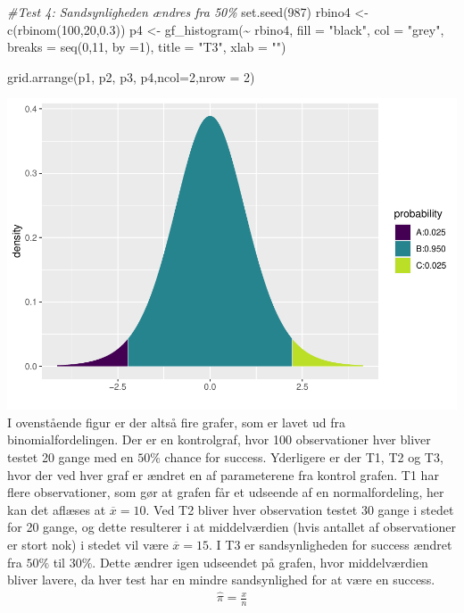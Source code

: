 \documentclass[
]{article}
\newenvironment{Shaded}{\begin{snugshade}}{\end{snugshade}}
\newcommand{\AttributeTok}[1]{\textcolor[rgb]{0.77,0.63,0.00}{#1}}
\newcommand{\CommentTok}[1]{\textcolor[rgb]{0.56,0.35,0.01}{\textit{#1}}}
\newcommand{\DecValTok}[1]{\textcolor[rgb]{0.00,0.00,0.81}{#1}}
\newcommand{\FloatTok}[1]{\textcolor[rgb]{0.00,0.00,0.81}{#1}}
\newcommand{\FunctionTok}[1]{\textcolor[rgb]{0.00,0.00,0.00}{#1}}
\newcommand{\NormalTok}[1]{#1}
\newcommand{\OtherTok}[1]{\textcolor[rgb]{0.56,0.35,0.01}{#1}}
\newcommand{\SpecialCharTok}[1]{\textcolor[rgb]{0.00,0.00,0.00}{#1}}
\newcommand{\StringTok}[1]{\textcolor[rgb]{0.31,0.60,0.02}{#1}}
\begin{document}
\begin{Shaded}
\begin{Highlighting}[]
\CommentTok{\#Test 4: Sandsynligheden ændres fra 50\%}
\FunctionTok{set.seed}\NormalTok{(}\DecValTok{987}\NormalTok{)}
\NormalTok{rbino4 }\OtherTok{\textless{}{-}} \FunctionTok{c}\NormalTok{(}\FunctionTok{rbinom}\NormalTok{(}\DecValTok{100}\NormalTok{,}\DecValTok{20}\NormalTok{,}\FloatTok{0.3}\NormalTok{))}
\NormalTok{p4 }\OtherTok{\textless{}{-}} \FunctionTok{gf\_histogram}\NormalTok{(}\SpecialCharTok{\textasciitilde{}}\NormalTok{ rbino4, }\AttributeTok{fill =} \StringTok{"black"}\NormalTok{, }\AttributeTok{col =} \StringTok{"grey"}\NormalTok{, }\AttributeTok{breaks =} \FunctionTok{seq}\NormalTok{(}\DecValTok{0}\NormalTok{,}\DecValTok{11}\NormalTok{, }\AttributeTok{by =}\DecValTok{1}\NormalTok{), }\AttributeTok{title =} \StringTok{"T3"}\NormalTok{, }\AttributeTok{xlab =} \StringTok{""}\NormalTok{) }

\FunctionTok{grid.arrange}\NormalTok{(p1, p2, p3, p4,}\AttributeTok{ncol=}\DecValTok{2}\NormalTok{,}\AttributeTok{nrow =} \DecValTok{2}\NormalTok{)}
\end{Highlighting}
\end{Shaded}

\includegraphics{TP2_files/figure-latex/unnamed-chunk-12-1.pdf} I
ovenstående figur er der altså fire grafer, som er lavet ud fra
binomialfordelingen. Der er en kontrolgraf, hvor 100 observationer hver
bliver testet 20 gange med en \(50\%\) chance for success. Yderligere er
der T1, T2 og T3, hvor der ved hver graf er ændret en af parameterene
fra kontrol grafen. T1 har flere observationer, som gør at grafen får et
udseende af en normalfordeling, her kan det aflæses at
\(\overline{x} = 10\). Ved T2 bliver hver observation testet 30 gange i
stedet for 20 gange, og dette resulterer i at middelværdien (hvis
antallet af observationer er stort nok) i stedet vil være
\(\overline{x} = 15\). I T3 er sandsynligheden for success ændret fra
\(50\%\) til \(30\%\). Dette ændrer igen udseendet på grafen, hvor
middelværdien bliver lavere, da hver test har en mindre sandsynlighed
for at være en success. \[
\begin{aligned}
\hat\pi = \frac{x}n
\end{aligned}
\]
\end{document}
